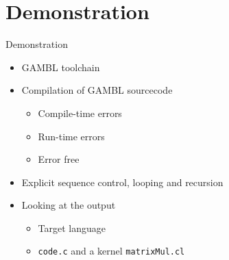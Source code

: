 \section{Demonstration} %
\label{sec:demonstration}
\begin{frame}{Demonstration}
    \begin{itemize}
        \item GAMBL toolchain
        \item Compilation of GAMBL sourcecode
        \begin{itemize}
            \item Compile-time errors
            \item Run-time errors
            \item Error free
        \end{itemize}
        \item Explicit sequence control, looping and recursion
        \item Looking at the output
        \begin{itemize}
            \item Target language
            \item \texttt{code.c} and a kernel \texttt{matrixMul.cl}
        \end{itemize}
    \end{itemize}
\end{frame}

